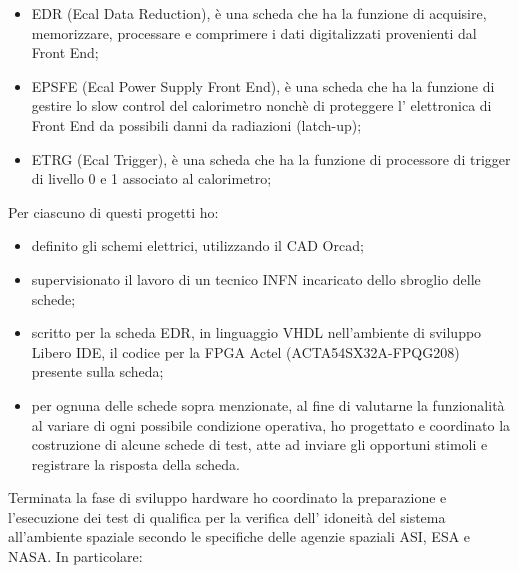 \documentclass[10pt]{article}
\begin{document}
\begin{itemize}
\item EDR (Ecal Data Reduction), \`e una scheda che ha la funzione di acquisire, memorizzare, processare e comprimere i dati digitalizzati provenienti dal Front End;
\item EPSFE (Ecal Power Supply Front End),  \`e una scheda che ha la funzione di gestire lo slow control del calorimetro nonch\`e di proteggere l' elettronica di Front End da possibili danni da radiazioni (latch-up); 
\item ETRG (Ecal Trigger), \`e una scheda che ha la funzione di processore di trigger di livello 0 e 1 associato al calorimetro;
\end{itemize}
Per ciascuno di questi progetti ho:
\begin{itemize}
\item definito gli schemi elettrici, utilizzando il CAD Orcad;
\item supervisionato il lavoro di un tecnico INFN incaricato dello sbroglio delle schede;
\item scritto per la scheda EDR, in linguaggio VHDL nell'ambiente di sviluppo Libero IDE\textsuperscript{\textregistered}, il codice per la FPGA Actel\textsuperscript{\textregistered}  (ACTA54SX32A-FPQG208) presente sulla scheda;
\item per ognuna delle schede sopra menzionate, al fine di valutarne la funzionalit\`a al variare di ogni possibile condizione operativa, ho progettato e coordinato la costruzione di alcune schede di test, atte ad inviare gli opportuni stimoli e registrare la risposta della scheda. 
\end{itemize}

Terminata la fase di sviluppo hardware ho coordinato la  preparazione e l'esecuzione dei test di qualifica per la verifica dell' idoneit\`a del sistema all'ambiente spaziale secondo le specifiche delle agenzie spaziali ASI, ESA e NASA.
In particolare: 
\end{document}

